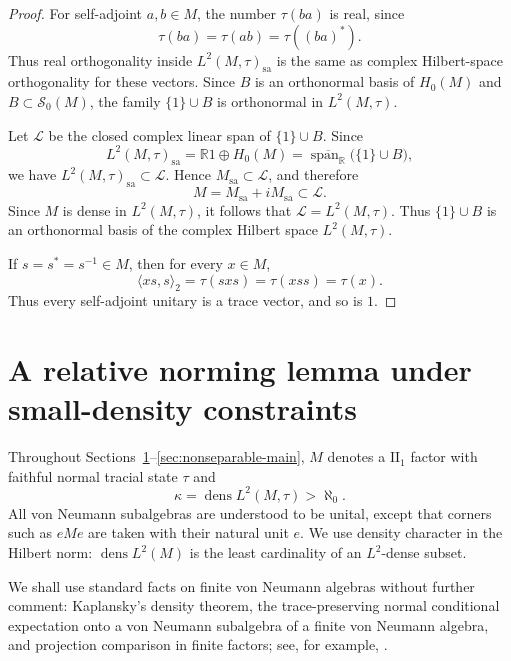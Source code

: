 \documentclass[11pt,letterpaper,reqno]{amsart}
\theoremstyle{definition}
\numberwithin{equation}{section}
\newcommand{\sa}{\mathrm{sa}}
\newcommand{\RR}{\mathbb R}
\newcommand{\one}{1}
\DeclareMathOperator{\spanop}{span}
\DeclareMathOperator{\dens}{dens}
\begin{document}
\begin{proof}
For self-adjoint $a,b\in M$, the number $\tau(ba)$ is real, since
\[
   \tau(ba)=\tau(ab)=\tau((ba)^*).
\]
Thus real orthogonality inside $L^2(M,\tau)_{\sa}$ is the same as complex
Hilbert-space orthogonality for these vectors.  Since
\(B\) is an orthonormal basis of \(H_0(M)\) and \(B\subset\mathcal S_0(M)\),
the family \(\{\one\}\cup B\) is orthonormal in \(L^2(M,\tau)\).

Let \(\mathcal L\) be the closed complex linear span of \(\{\one\}\cup B\).
Since
\[
   L^2(M,\tau)_{\sa}
   =
   \RR\one\oplus H_0(M)
   =
   \overline{\spanop_{\RR}}\bigl(\{\one\}\cup B\bigr),
\]
we have \(L^2(M,\tau)_{\sa}\subset \mathcal L\).  Hence
\(M_{\sa}\subset\mathcal L\), and therefore
\[
   M=M_{\sa}+iM_{\sa}\subset\mathcal L .
\]
Since \(M\) is dense in \(L^2(M,\tau)\), it follows that
\(\mathcal L=L^2(M,\tau)\).  Thus \(\{\one\}\cup B\) is an orthonormal
basis of the complex Hilbert space \(L^2(M,\tau)\).

If $s=s^*=s^{-1}\in M$, then for every $x\in M$,
\[
   \langle xs,s\rangle_2=\tau(sxs)=\tau(xss)=\tau(x).
\]
Thus every self-adjoint unitary is a trace vector, and so is $\one$.
\end{proof}



\section{A relative norming lemma under small-density constraints}
\label{sec:relative-norming}

Throughout Sections~\ref{sec:relative-norming}--\ref{sec:nonseparable-main},
$M$ denotes a $\mathrm{II}_1$ factor with faithful normal tracial state
$\tau$ and
\[
   \kappa=\dens L^2(M,\tau)>\aleph_0.
\]
All von Neumann subalgebras are understood to be unital, except that corners such as $eMe$ are taken with their natural unit $e$.  We use density character in the Hilbert norm: $\dens L^2(M)$ is the least cardinality of an $L^2$-dense subset.

We shall use standard facts on finite von Neumann algebras without further
comment: Kaplansky's density theorem, the trace-preserving normal conditional
expectation onto a von Neumann subalgebra of a finite von Neumann algebra, and
projection comparison in finite factors; see, for example,
\cite{Tak72,KR97II,Tak02}.
\end{document}
